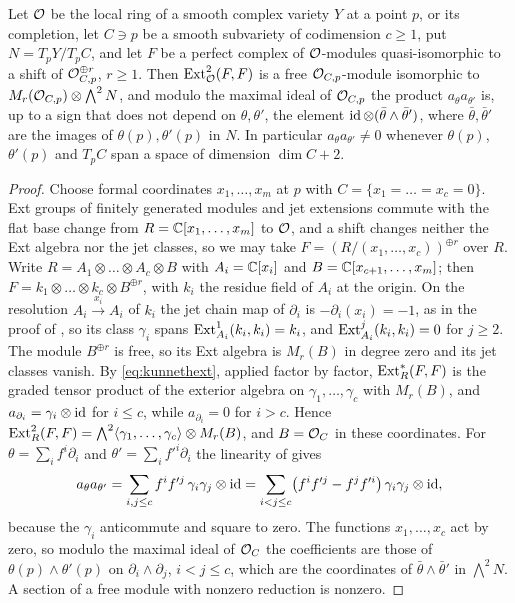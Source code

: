 \begin{lemma}\label{lem:freegerm}
Let $\mathcal{O}$ be the local ring of a smooth complex variety $Y$ at a point $p$,
or its completion, let $C\ni p$ be a smooth subvariety of codimension
$c\ge1$, put $N=T_{p}Y/T_{p}C$, and let $F$ be a perfect complex of
$\mathcal{O}$-modules quasi-isomorphic to a shift of $\mathcal{O}_{C,p}^{\oplus r}$, $r\ge1$.
Then $\operatorname{Ext}^{2}_{\mathcal{O}}(F,F)$ is a free $\mathcal{O}_{C,p}$-module isomorphic to
$M_{r}(\mathcal{O}_{C,p})\otimes\bigwedge^{2}N$, and modulo the maximal ideal of
$\mathcal{O}_{C,p}$ the product $a_{\theta}a_{\theta'}$ is, up to a sign that does
not depend on $\theta,\theta'$, the element $\operatorname{id}\otimes(\bar\theta\wedge\bar\theta')$,
where $\bar\theta,\bar\theta'$ are the images of $\theta(p),\theta'(p)$ in
$N$. In particular $a_{\theta}a_{\theta'}\ne0$ whenever $\theta(p)$,
$\theta'(p)$ and $T_{p}C$ span a space of dimension $\dim C+2$.
\end{lemma}

\begin{proof}
Choose formal coordinates $x_{1},\dots,x_{m}$ at $p$ with
$C=\{x_{1}=\dots=x_{c}=0\}$. Ext groups of finitely generated modules and jet
extensions commute with the flat base change from
$R=\mathbb{C}[x_{1},\dots,x_{m}]$ to $\mathcal{O}$, and a shift changes neither the Ext
algebra nor the jet classes, so we may take $F=(R/(x_{1},\dots,x_{c}))^{\oplus r}$
over $R$. Write $R=A_{1}\otimes\dots\otimes A_{c}\otimes B$ with
$A_{i}=\mathbb{C}[x_{i}]$ and $B=\mathbb{C}[x_{c+1},\dots,x_{m}]$; then
$F=k_{1}\otimes\dots\otimes k_{c}\otimes B^{\oplus r}$, with $k_{i}$ the
residue field of $A_{i}$ at the origin. On the resolution
$A_{i}\xrightarrow{x_{i}}A_{i}$ of $k_{i}$ the jet chain map of
$\partial_{i}$ is $-\partial_{i}(x_{i})=-1$, as in the proof of
, so its class $\gamma_{i}$ spans
$\operatorname{Ext}^{1}_{A_{i}}(k_{i},k_{i})=k_{i}$, and $\operatorname{Ext}^{j}_{A_{i}}(k_{i},k_{i})=0$ for
$j\ge2$. The module $B^{\oplus r}$ is free, so its Ext algebra is
$M_{r}(B)$ in degree zero and its jet classes vanish. By
\eqref{eq:kunnethext}, applied factor by factor, $\operatorname{Ext}^{*}_{R}(F,F)$ is the
graded tensor product of the exterior algebra on $\gamma_{1},\dots,\gamma_{c}$
with $M_{r}(B)$, and $a_{\partial_{i}}=\gamma_{i}\otimes\operatorname{id}$ for $i\le c$,
while $a_{\partial_{i}}=0$ for $i>c$. Hence
$\operatorname{Ext}^{2}_{R}(F,F)=\bigwedge^{2}\langle\gamma_{1},\dots,\gamma_{c}\rangle\otimes M_{r}(B)$,
and $B=\mathcal{O}_{C}$ in these coordinates. For $\theta=\sum_{i}f^{i}\partial_{i}$
and $\theta'=\sum_{i}f'^{i}\partial_{i}$ the linearity of 
gives
\[
  a_{\theta}a_{\theta'}=\sum_{i,j\le c}f^{i}f'^{j}\,\gamma_{i}\gamma_{j}\otimes\operatorname{id}
  =\sum_{i<j\le c}\bigl(f^{i}f'^{j}-f^{j}f'^{i}\bigr)\,\gamma_{i}\gamma_{j}\otimes\operatorname{id},
\]
because the $\gamma_{i}$ anticommute and square to zero. The functions
$x_{1},\dots,x_{c}$ act by zero, so modulo the maximal ideal of $\mathcal{O}_{C}$ the
coefficients are those of $\theta(p)\wedge\theta'(p)$ on
$\partial_{i}\wedge\partial_{j}$, $i<j\le c$, which are the coordinates of
$\bar\theta\wedge\bar\theta'$ in $\bigwedge^{2}N$. A section of a free module
with nonzero reduction is nonzero.
\end{proof}

